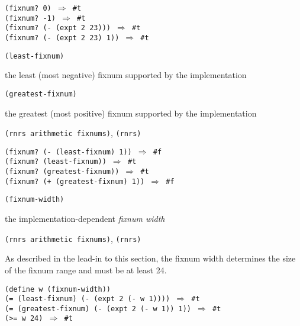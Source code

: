 \begin{alltt}
(fixnum? 0) \(\Rightarrow\) \#{}t
(fixnum? -1) \(\Rightarrow\) \#{}t
(fixnum? (- (expt 2 23))) \(\Rightarrow\) \#{}t
(fixnum? (- (expt 2 23) 1)) \(\Rightarrow\) \#{}t
\end{alltt}

\begin{description}

\label{objects_s151}\item[procedure] \texttt{(least-fixnum)}



\item[returns] the least (most negative) fixnum supported by the implementation


\item[procedure] \texttt{(greatest-fixnum)}



\item[returns] the greatest (most positive) fixnum supported by the implementation


\item[libraries] \texttt{(rnrs arithmetic fixnums)}, \texttt{(rnrs)}
\end{description}


\begin{alltt}
(fixnum? (- (least-fixnum) 1)) \(\Rightarrow\) \#{}f
(fixnum? (least-fixnum)) \(\Rightarrow\) \#{}t
(fixnum? (greatest-fixnum)) \(\Rightarrow\) \#{}t
(fixnum? (+ (greatest-fixnum) 1)) \(\Rightarrow\) \#{}f
\end{alltt}

\begin{description}

\label{objects_s152}\item[procedure] \texttt{(fixnum-width)}



\item[returns] the implementation-dependent \textit{fixnum width}


\item[libraries] \texttt{(rnrs arithmetic fixnums)}, \texttt{(rnrs)}
\end{description}


As described in the lead-in to this section, the fixnum width determines
the size of the fixnum range and must be at least 24.


\begin{alltt}
(define w (fixnum-width))
(= (least-fixnum) (- (expt 2 (- w 1)))) \(\Rightarrow\) \#{}t
(= (greatest-fixnum) (- (expt 2 (- w 1)) 1)) \(\Rightarrow\) \#{}t
(\textgreater{}= w 24) \(\Rightarrow\) \#{}t
\end{alltt}

